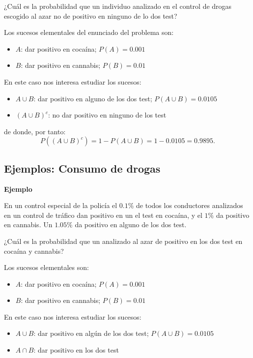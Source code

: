 \documentclass[]{book}
\providecommand{\tightlist}{%
  \setlength{\itemsep}{0pt}\setlength{\parskip}{0pt}}
\begin{document}
¿Cuál es la probabilidad que un individuo analizado en el control de drogas escogido al azar no de positivo en ninguno de lo dos test?

Los sucesos elementales del enunciado del problema son:

\begin{itemize}
\tightlist
\item
  \(A\): dar positivo en cocaína; \(P(A)=0.001\)
\item
  \(B\): dar positivo en cannabis; \(P(B)=0.01\)
\end{itemize}

En este caso nos interesa estudiar los sucesos:

\begin{itemize}
\tightlist
\item
  \(A\cup B\): dar positivo en alguno de los dos test; \(P(A\cup B)=0.0105\)
\item
  \((A\cup B)^c\): no dar positivo en ninguno de los test
\end{itemize}

de donde, por tanto:
\[P((A\cup B)^c)=1-P(A\cup B)=1-0.0105=0.9895.\]

\hypertarget{ejemplos-consumo-de-drogas}{%
\subsection{Ejemplos: Consumo de drogas}\label{ejemplos-consumo-de-drogas}}

\textbf{Ejemplo}

En un control especial de la policía el \(0.1\%\) de todos los conductores analizados en un control de tráfico dan positivo en un el test en cocaína, y el \(1\%\) da positivo en cannabis. Un \(1.05\%\) da positivo en alguno de los dos test.

¿Cuál es la probabilidad que un analizado al azar de positivo en los dos test en cocaína y cannabis?

Los sucesos elementales son:

\begin{itemize}
\tightlist
\item
  \(A\): dar positivo en cocaína; \(P(A)=0.001\)
\item
  \(B\): dar positivo en cannabis; \(P(B)=0.01\)
\end{itemize}

En este caso nos interesa estudiar los sucesos:

\begin{itemize}
\tightlist
\item
  \(A\cup B\): dar positivo en algún de los dos test; \(P(A\cup B)=0.0105\)
\item
  \(A\cap B\): dar positivo en los dos test
\end{itemize}
\end{document}
